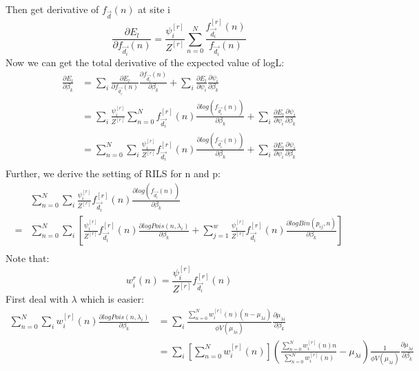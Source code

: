 \documentclass[]{article}
\begin{document}
Then get derivative of $f_{\vec{d}}(n)$ at site i
\begin{equation}
\frac{\partial E_{l}}{\partial f_{\vec{d_{i}}}(n)}=\frac{\psi_{i}^{[r]}}{Z^{[r]}}\sum_{n=0}^{N}\frac{f^{[r]}_{\vec{d_{i}}}(n)}{f_{\vec{d_{i}}}(n)}
\end{equation}
Now we can get the total derivative of the expected value of logL:
\begin{equation}
	\begin{aligned}
	\frac{\partial E_{l}}{\partial \beta_{k}}&=\sum_{i}\frac{\partial E_{l}}{\partial f_{\vec{d_{i}}}(n)}\frac{\partial f_{\vec{d_{i}}}(n)}{\partial \beta_{k}}+\sum_{i}\frac{\partial E_{l}}{\partial \psi_{i}}\frac{\partial \psi_{i}}{\partial \beta_{k}}\\
	&=\sum_{i}\frac{\psi_{i}^{[r]}}{Z^{[r]}}\sum_{n=0}^{N}f^{[r]}_{\vec{d_{i}}}(n)\frac{\partial log(f_{\vec{d_{i}}}(n))}{\partial \beta_{k}}+\sum_{i}\frac{\partial E_{l}}{\partial \psi_{i}}\frac{\partial \psi_{i}}{\partial \beta_{k}}\\
	&=\sum_{n=0}^{N}\sum_{i}\frac{\psi_{i}^{[r]}}{Z^{[r]}}f^{[r]}_{\vec{d_{i}}}(n)\frac{\partial log(f_{\vec{d_{i}}}(n))}{\partial \beta_{k}}+\sum_{i}\frac{\partial E_{l}}{\partial \psi_{i}}\frac{\partial \psi_{i}}{\partial \beta_{k}}\\
	\end{aligned}
\end{equation}
Further, we derive the setting of RILS for n and p:
\begin{equation}
	\begin{aligned}
	&\sum_{n=0}^{N}\sum_{i}\frac{\psi_{i}^{[r]}}{Z^{[r]}}f^{[r]}_{\vec{d_{i}}}(n)\frac{\partial log(f_{\vec{d_{i}}}(n))}{\partial \beta_{k}}\\
	=&\sum_{n=0}^{N}\sum_{i}[\frac{\psi_{i}^{[r]}}{Z^{[r]}}f^{[r]}_{\vec{d_{i}}}(n)\frac{\partial logPois(n,\lambda_{i})}{\partial \beta_{k}}+\sum_{j=1}^{w}\frac{\psi_{i}^{[r]}}{Z^{[r]}}f^{[r]}_{\vec{d_{i}}}(n)\frac{\partial logBin(p_{ij},n)}{\partial \beta_{k}}]\\
	\end{aligned}
\end{equation}
Note that:
\[
w_{i}^{r}(n)=\frac{\psi_{i}^{[r]}}{Z^{[r]}}f^{[r]}_{\vec{d_{i}}}(n)
\]
First deal with $\lambda$ which is easier:
\begin{equation}
	\begin{aligned}
	\sum_{n=0}^{N}\sum_{i}w_{i}^{[r]}(n)\frac{\partial logPois(n,\lambda_{i})}{\partial \beta_{k}}&=\sum_{i}\frac{\sum_{n=0}^{N}w_{i}^{[r]}(n)(n-\mu_{\lambda i})}{\phi V(\mu_{\lambda i})}\frac{\partial \mu_{\lambda i}}{\partial \beta_{k}}\\
	&=\sum_{i}[\sum_{n=0}^{N}w_{i}^{[r]}(n)](\frac{\sum_{n=0}^{N}w_{i}^{[r]}(n)n}{\sum_{n=0}^{N}w_{i}^{[r]}(n)}-\mu_{\lambda i})\frac{1}{\phi V(\mu_{\lambda i})}\frac{\partial \mu_{\lambda i}}{\partial \beta_{k}}
	\end{aligned}
\end{equation}
\end{document}
